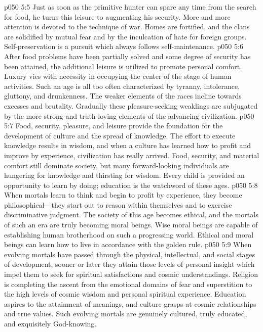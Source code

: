 \pc \vs p050 5:5 \bibnobreakspace {} Just as soon as the primitive hunter can spare any time from the search for food, he turns this leisure to augmenting his security. More and more attention is devoted to the technique of war. Homes are fortified, and the clans are solidified by mutual fear and by the inculcation of hate for foreign groups. Self\hyp{}preservation is a pursuit which always follows self\hyp{}maintenance.
\pc \vs p050 5:6 \bibnobreakspace {} After food problems have been partially solved and some degree of security has been attained, the additional leisure is utilized to promote personal comfort. Luxury vies with necessity in occupying the center of the stage of human activities. Such an age is all too often characterized by tyranny, intolerance, gluttony, and drunkenness. The weaker elements of the races incline towards excesses and brutality. Gradually these pleasure\hyp{}seeking weaklings are subjugated by the more strong and truth\hyp{}loving elements of the advancing civilization.
\pc \vs p050 5:7 \bibnobreakspace {} Food, security, pleasure, and leisure provide the foundation for the development of culture and the spread of knowledge. The effort to execute knowledge results in wisdom, and when a culture has learned how to profit and improve by experience, civilization has really arrived. Food, security, and material comfort still dominate society, but many forward\hyp{}looking individuals are hungering for knowledge and thirsting for wisdom. Every child is provided an opportunity to learn by doing; education is the watchword of these ages.
\pc \vs p050 5:8 \bibnobreakspace {} When mortals learn to think and begin to profit by experience, they become philosophical---they start out to reason within themselves and to exercise discriminative judgment. The society of this age becomes ethical, and the mortals of such an era are truly becoming moral beings. Wise moral beings are capable of establishing human brotherhood on such a progressing world. Ethical and moral beings can learn how to live in accordance with the golden rule.
\pc \vs p050 5:9 \bibnobreakspace {} When evolving mortals have passed through the physical, intellectual, and social stages of development, sooner or later they attain those levels of personal insight which impel them to seek for spiritual satisfactions and cosmic understandings. Religion is completing the ascent from the emotional domains of fear and superstition to the high levels of cosmic wisdom and personal spiritual experience. Education aspires to the attainment of meanings, and culture grasps at cosmic relationships and true values. Such evolving mortals are genuinely cultured, truly educated, and exquisitely God\hyp{}knowing.
